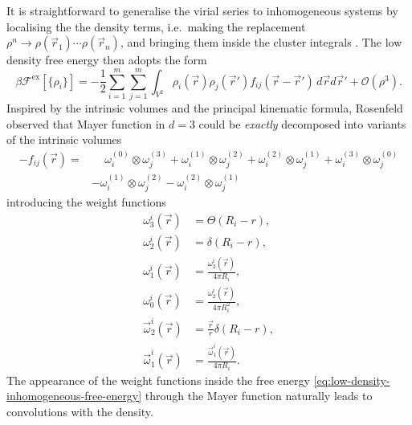 It is straightforward to generalise the virial series to inhomogeneous systems by localising the the density terms, i.e.\ making the replacement $\rho^n \to \rho(\vec{r}_1) \cdots \rho(\vec{r}_n)$, and bringing them inside the cluster integrals \cite{StillingerJCP1962,RowlinsonPRSA1985}.
The low density free energy then adopts the form
\begin{equation}\label{eq:low-density-inhomogeneous-free-energy}
  \beta \mathcal{F}^\mathrm{ex}[\{\rho_i\}]
  =
  - \frac{1}{2}
  \sum_{i = 1}^m \sum_{j = 1}^m \int_{V^2}
  \rho_i(\vec{r}) \rho_j(\vec{r}')
  f_{ij}(\vec{r} - \vec{r}')
  \, d\vec{r} d\vec{r}'
  + \mathcal{O}(\rho^3).
\end{equation}
Inspired by the intrinsic volumes and the principal kinematic formula, Rosenfeld observed that Mayer function in $d=3$ could be \emph{exactly} decomposed into variants of the intrinsic volumes%
\cite{RosenfeldPRL1989}
\begin{equation*}
  \begin{split}
    -f_{ij}(\vec{r})
    =& \quad\,
    \omega_i^{(0)} \otimes \omega_j^{(3)}
    + \omega_i^{(1)} \otimes \omega_j^{(2)}
    + \omega_i^{(2)} \otimes \omega_j^{(1)}
    + \omega_i^{(3)} \otimes \omega_j^{(0)}
    \\ &
    - \omega_i^{(1)} \otimes \omega_j^{(2)}
    - \omega_i^{(2)} \otimes \omega_j^{(1)}
  \end{split}
\end{equation*}
introducing the weight functions
\begin{subequations}
  \begin{align}
    \omega_3^i(\vec{r})
    &=
    \Theta(R_i - r),
    \\
    \omega_2^i(\vec{r})
    &=
    \delta(R_i - r),
    \\
    \omega_1^i(\vec{r})
    &=
    \frac{\omega_2^i(\vec{r})}{4\pi R_i},
    \\
    \omega_0^i(\vec{r})
    &=
    \frac{\omega_2^i(\vec{r})}{4\pi R_i^2},
    \\
    \vec{\omega}_2^i(\vec{r})
    &=
    \frac{\vec{r}}{r} \delta(R_i - r),
    \\
    \vec{\omega}_1^i(\vec{r})
    &=
    \frac{\vec{\omega}_1^i(\vec{r})}{4\pi R_i}.
  \end{align}
\end{subequations}
The appearance of the weight functions inside the free energy \eqref{eq:low-density-inhomogeneous-free-energy} through the Mayer function naturally leads to convolutions with the density.
